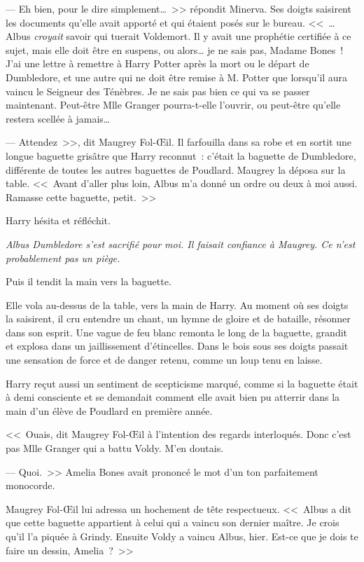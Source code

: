 --- Eh bien, pour le dire simplement…~>> répondit Minerva. Ses doigts saisirent les documents qu'elle avait apporté et qui étaient posés sur le bureau. <<~… Albus \emph{croyait} savoir qui tuerait Voldemort. Il y avait une prophétie certifiée à ce sujet, mais elle doit être en suspens, ou alors… je ne sais pas, Madame Bones~! J'ai une lettre à remettre à Harry Potter après la mort ou le départ de Dumbledore, et une autre qui ne doit être remise à M. Potter que lorsqu'il aura vaincu le Seigneur des Ténèbres. Je ne sais pas bien ce qui va se passer maintenant. Peut-être Mlle Granger pourra-t-elle l'ouvrir, ou peut-être qu'elle restera scellée à jamais…

--- Attendez~>>, dit Maugrey Fol-Œil. Il farfouilla dans sa robe et en sortit une longue baguette grisâtre que Harry reconnut~: c'était la baguette de Dumbledore, différente de toutes les autres baguettes de Poudlard. Maugrey la déposa sur la table. <<~Avant d'aller plus loin, Albus m'a donné un ordre ou deux à moi aussi. Ramasse cette baguette, petit.~>>

Harry hésita et réfléchit.

\emph{Albus Dumbledore s'est sacrifié pour moi. Il faisait confiance à Maugrey. Ce n'est probablement pas un piège.}

Puis il tendit la main vers la baguette.

Elle vola au-dessus de la table, vers la main de Harry. Au moment où ses doigts la saisirent, il cru entendre un chant, un hymne de gloire et de bataille, résonner dans son esprit. Une vague de feu blanc remonta le long de la baguette, grandit et explosa dans un jaillissement d'étincelles. Dans le bois sous ses doigts passait une sensation de force et de danger retenu, comme un loup tenu en laisse.

Harry reçut aussi un sentiment de scepticisme marqué, comme si la baguette était à demi consciente et se demandait comment elle avait bien pu atterrir dans la main d'un élève de Poudlard en première année.

<<~Ouais, dit Maugrey Fol-Œil à l'intention des regards interloqués. Donc c'est pas Mlle Granger qui a battu Voldy. M'en doutais.

--- Quoi.~>> Amelia Bones avait prononcé le mot d'un ton parfaitement monocorde.

Maugrey Fol-Œil lui adressa un hochement de tête respectueux. <<~Albus a dit que cette baguette appartient à celui qui a vaincu son dernier maître. Je crois qu'il l'a piquée à Grindy. Ensuite Voldy a vaincu Albus, hier. Est-ce que je dois te faire un dessin, Amelia~?~>>

